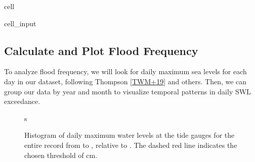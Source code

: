 \documentclass[letterpaper,10pt,english]{jupyterBook}
\begin{document}
\begin{sphinxuseclass}{cell}\begin{sphinxVerbatimInput}

\begin{sphinxuseclass}{cell_input}
\begin{sphinxVerbatim}[commandchars=\\\{\}]
\PYG{p}{[}\PYG{p}{]}  \PYG{p}{[}\PYG{p}{]}
\PYG{p}{[}\PYG{p}{]}  \PYG{p}{[}\PYG{p}{]}
\end{sphinxVerbatim}

\end{sphinxuseclass}\end{sphinxVerbatimInput}

\end{sphinxuseclass}

\subsection{Calculate and Plot Flood Frequency}
\label{\detokenize{notebooks/FloodFrequency:calculate-and-plot-flood-frequency}}
\sphinxAtStartPar
To analyze flood frequency, we will look for daily maximum sea levels for each day in our dataset, following Thompson  {[}\hyperlink{cite.notebooks/FloodFrequency:id4}{TWM+19}{]} and others. Then, we can group our data by year and month to visualize temporal patterns in daily SWL exceedance.

\begin{figure}[htbp]
\centering
\capstart

\noindent{}
\caption{Histogram of daily maximum water levels at the  tide gauges for the entire record from  to , relative to . The dashed red line indicates the chosen threshold of  cm.}\label{\detokenize{notebooks/FloodFrequency:fig-histogram}}
\begin{sphinxlegend}
\sphinxAtStartPar
s
\end{sphinxlegend}
\end{figure}
\end{document}
